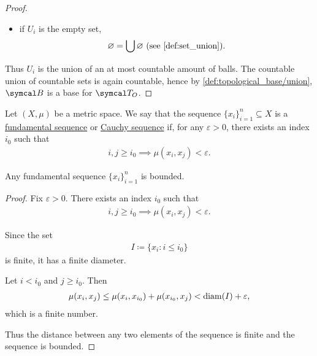 \begin{proof}
\begin{itemize}
    \item if $U_i$ is the empty set,
    \begin{align*}
      \varnothing = \bigcup \varnothing \text{ (see \cref{def:set_union})}.
    \end{align*}
  \end{itemize}

  Thus $U_i$ is the union of an at most countable amount of balls. The countable union of countable sets is again countable, hence by \cref{def:topological_base/union}, $\Cal{B}$ is a base for $\Cal{T}_O$.
\end{proof}

\begin{definition}\label{def:fundamental_sequence}
  Let $(X, \mu)$ be a metric space. We say that the sequence $\{ x_i \}_{i=1}^n \subseteq X$ is a \ul{fundamental sequence} or \ul{Cauchy sequence} if, for any $\varepsilon > 0$, there exists an index $i_0$ such that
  \begin{align*}
    i, j \geq i_0 \implies \mu(x_i, x_j) < \varepsilon.
  \end{align*}
\end{definition}

\begin{proposition}\label{thm:fundamental_sequence_is_bounded}
  Any fundamental sequence $\{ x_i \}_{i=1}^n$ is bounded.
\end{proposition}
\begin{proof}
  Fix $\varepsilon > 0$. There exists an index $i_0$ such that
  \begin{align*}
    i, j \geq i_0 \implies \mu(x_i, x_j) < \varepsilon.
  \end{align*}

  Since the set
  \begin{align*}
    I \coloneqq \{ x_i \colon i \leq i_0 \}
  \end{align*}
  is finite, it has a finite diameter.

  Let $i < i_0$ and $j \geq i_0$. Then
  \begin{align*}
    \mu(x_i, x_j) \leq \mu(x_i, x_{i_0}) + \mu(x_{i_0}, x_j) < \operatorname{diam}(I) + \varepsilon,
  \end{align*}
  which is a finite number.

  Thus the distance between any two elements of the sequence is finite and the sequence is bounded.
\end{proof}

